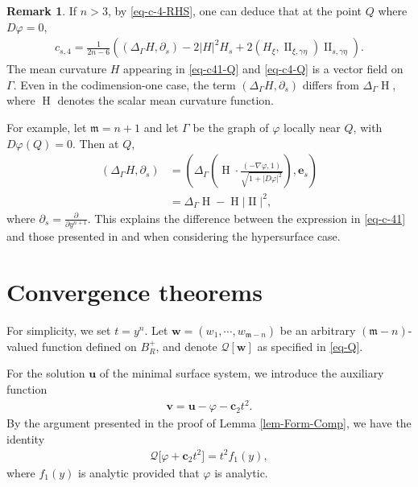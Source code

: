 \documentclass[11pt,reqno]{amsart}
\newcommand{\fm}{\mathfrak{m}}
\theoremstyle{definition}
\newtheorem{remark}[theorem]{Remark}
\numberwithin{equation}{section}
\begin{document}
\begin{remark}\label{rmk-c4}
If \(n>3\), by \eqref{eq-c-4-RHS}, one can deduce that at the point \(Q\) where \(D\varphi = 0\),
\begin{align}\label{eq-c4-Q}
    c_{s,4} = \frac{1}{2n-6} \left( ( \Delta_\Gamma H, \partial_s ) - 2|H|^2 H_s + 2( H_{\xi}, \operatorname{II}_{\xi,\gamma\eta} ) \operatorname{II}_{s,\gamma\eta} \right).
\end{align}
The mean curvature \(H\) appearing in \eqref{eq-c41-Q} and \eqref{eq-c4-Q} is a vector field on \(\Gamma\). Even in the codimension-one case, the term \(( \Delta_\Gamma H, \partial_s )\) differs from \(\Delta_\Gamma \operatorname{H}\), where \(\operatorname{H}\) denotes the scalar mean curvature function.

For example, let \(\fm = n+1\) and let \(\Gamma\) be the graph of \(\varphi\) locally near \(Q\), with \(D\varphi(Q) = 0\). Then at \(Q\),
\begin{align}
    ( \Delta_\Gamma H, \partial_s )&= \left( \Delta_\Gamma \left( \operatorname{H} \cdot \frac{(-\nabla \varphi, 1)}{\sqrt{1+|D\varphi|^2}} \right), \mathbf{e}_s \right) \\
    &= \Delta_\Gamma \operatorname{H} - \operatorname{H} |\operatorname{II}|^2,
\end{align}
where \(\partial_s = \frac{\partial}{\partial y^{n+1}}\). This explains the difference between the expression in \eqref{eq-c-41} and those presented in \cite{Jiang} and \cite{HanJiang2023} when considering the hypersurface case.
\end{remark}





\section{Convergence theorems}\label{sec-Conv}
For simplicity, we set $t=y^n$. Let $\mathbf{w} = (w_1,\cdots, w_{\fm-n})$ be an arbitrary $(\fm-n)$-valued function defined on $B^+_R$, and denote $\mathcal{Q}[\mathbf{w}]$ as specified in \eqref{eq-Q}.

For the solution $\mathbf{u}$ of the minimal surface system, we introduce the auxiliary function
\begin{align}\label{def-v}
    \mathbf{v} = \mathbf{u} - \varphi - \mathbf{c}_2 t^2.
\end{align}
By the argument presented in the proof of Lemma \ref{lem-Form-Comp}, we have the identity
\begin{align}
     \mathcal{Q}\bigl[\varphi + \mathbf{c}_2 t^2\bigr] = t^2 f_1(y),
\end{align}
where $f_1(y)$ is analytic provided that $\varphi$ is analytic.
\end{document}
